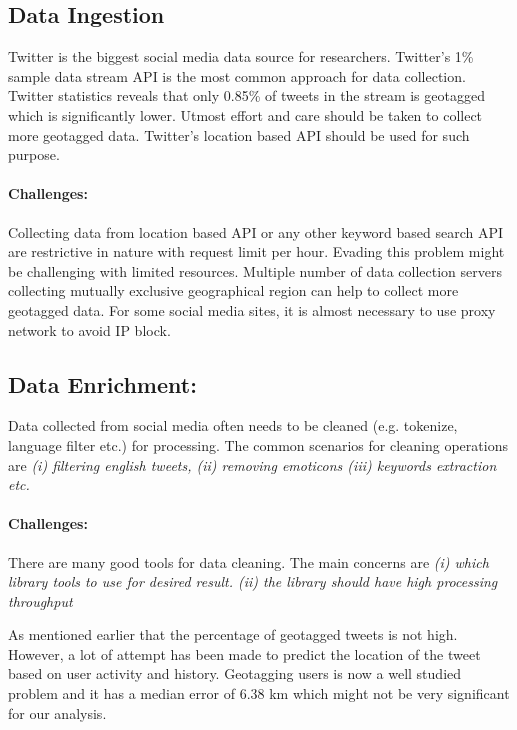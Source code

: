 \subsection{Data Ingestion}
Twitter is the biggest social media data source for researchers. Twitter's 1\% sample data stream API is the most common approach for data collection. Twitter statistics reveals that only 0.85\% of tweets in the stream is geotagged \cite{sloan2013knowing} which is significantly lower. Utmost effort and care should be taken to collect more geotagged data. Twitter's location based API should be used for such purpose.

\paragraph{Challenges:}
Collecting data from location based API or any other keyword based search API are restrictive in nature with request limit per hour.
Evading this problem might be challenging with limited resources. Multiple number of data collection servers collecting mutually exclusive geographical region can help to collect more geotagged data. For some social media sites, it is almost necessary to use proxy network to avoid IP block.

\subsection{Data Enrichment:}
Data collected from social media often needs to be cleaned (e.g. tokenize, language filter etc.) for processing. The common scenarios for cleaning operations are {\em(i) filtering english tweets, (ii) removing emoticons (iii) keywords extraction etc. }

\vspace{-2mm}
\paragraph{Challenges:} There are many good tools for data cleaning. The main concerns are {\em(i) which library tools to use for desired result. (ii) the library should have high processing throughput}

As mentioned earlier that the percentage of geotagged tweets is not high. However, a lot of attempt has been made to predict the location of the tweet based on user activity and history.  Geotagging users is now a well studied problem and it has a median error of 6.38 km which might not be very significant for our analysis\cite{compton2014geotagging}.

